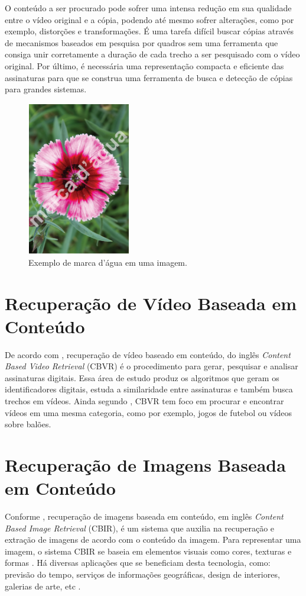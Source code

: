     O conteúdo a ser procurado pode sofrer uma intensa redução em sua qualidade entre o vídeo original e a cópia, podendo até mesmo sofrer alterações, como por exemplo, distorções e transformações. É uma tarefa difícil buscar cópias através de mecanismos baseados em pesquisa por quadros sem uma ferramenta que consiga unir corretamente a duração de cada trecho a ser pesquisado com o vídeo original. Por último, é necessária uma representação compacta e eficiente das assinaturas para que se construa uma ferramenta de busca e detecção de cópias para grandes sistemas.
    
    	\begin{figure}[h]
        \centering
        \includegraphics[width=0.4\textwidth]{dados/figuras/marca_dagua.png}
        \caption{Exemplo de marca d'água em uma imagem.}
    	\label{fig:marcadagua}
    \end{figure}

\section{Recuperação de Vídeo Baseada em Conteúdo}
De acordo com \citeauthor{law2007video}, recuperação de vídeo baseado em conteúdo, do inglês \textit{Content Based Video Retrieval} (CBVR) é o procedimento para gerar, pesquisar e analisar assinaturas digitais. Essa área de estudo produz os algoritmos que geram os identificadores digitais, estuda a similaridade entre assinaturas e também busca trechos em vídeos. Ainda segundo \citeauthor{law2007video}, CBVR tem foco em procurar e encontrar vídeos em uma mesma categoria, como por exemplo, jogos de futebol ou vídeos sobre balões.

\section{Recuperação de Imagens Baseada em Conteúdo}
Conforme \citeauthor{gudivada1995content}, recuperação de imagens baseada em conteúdo, em inglês \textit{Content Based Image Retrieval} (CBIR), é um sistema que auxilia na recuperação e extração de imagens de acordo com o conteúdo da imagem. Para representar uma imagem, o sistema CBIR se baseia em elementos visuais como cores, texturas e formas \citeauthor{vikhar2016improved}. Há diversas aplicações que se beneficiam desta tecnologia, como: previsão do tempo, serviços de informações geográficas, design de interiores, galerias de arte, etc \citeauthor{gudivada1995content}.

